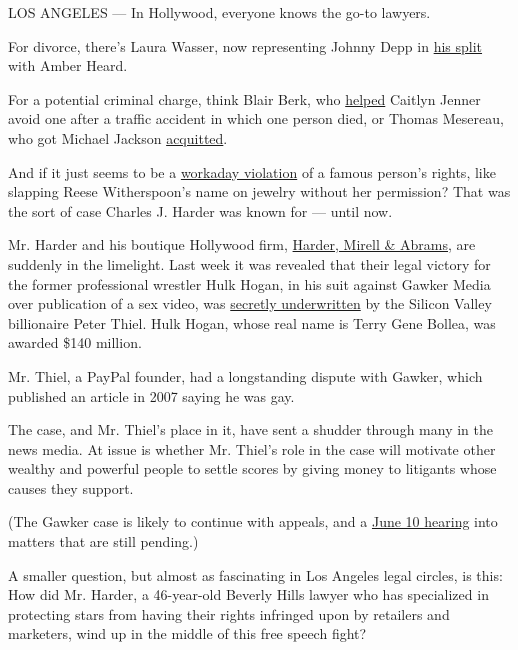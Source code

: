 LOS ANGELES --- In Hollywood, everyone knows the go-to lawyers.

For divorce, there's Laura Wasser, now representing Johnny Depp in
\href{http://www.people.com/article/johnny-depp-amber-heard-alleged-abuse-financial-gain}{his
split} with Amber Heard.

For a potential criminal charge, think Blair Berk, who
\href{http://www.latimes.com/local/lanow/la-me-ln-charges-declined-caitlyn-jenner-20150930-story.html}{helped}
Caitlyn Jenner avoid one after a traffic accident in which one person
died, or Thomas Mesereau, who got Michael Jackson
\href{http://www.today.com/id/8208361/ns/today-today_entertainment/t/mez-dominated-jackson-courtroom/\#.V0s_zfkrK70}{acquitted}.

And if it just seems to be a
\href{http://www.hollywoodreporter.com/thr-esq/hollywood-docket-reese-witherspoon-settles-866160}{workaday
violation} of a famous person's rights, like slapping Reese
Witherspoon's name on jewelry without her permission? That was the sort
of case Charles J. Harder was known for --- until now.

Mr. Harder and his boutique Hollywood firm,
\href{http://hmafirm.com/}{Harder, Mirell \& Abrams}, are suddenly in
the limelight. Last week it was revealed that their legal victory for
the former professional wrestler Hulk Hogan, in his suit against Gawker
Media over publication of a sex video, was
\href{http://www.nytimes3xbfgragh.onion/2016/05/26/business/dealbook/peter-thiel-tech-billionaire-reveals-secret-war-with-gawker.html}{secretly
underwritten} by the Silicon Valley billionaire Peter Thiel. Hulk Hogan,
whose real name is Terry Gene Bollea, was awarded \$140 million.

Mr. Thiel, a PayPal founder, had a longstanding dispute with Gawker,
which published an article in 2007 saying he was gay.

The case, and Mr. Thiel's place in it, have sent a shudder through many
in the news media. At issue is whether Mr. Thiel's role in the case will
motivate other wealthy and powerful people to settle scores by giving
money to litigants whose causes they support.

(The Gawker case is likely to continue with appeals, and a
\href{http://www.hollywoodreporter.com/thr-esq/judge-upholds-hulk-hogans-140-897301}{June
10 hearing} into matters that are still pending.)

A smaller question, but almost as fascinating in Los Angeles legal
circles, is this: How did Mr. Harder, a 46-year-old Beverly Hills lawyer
who has specialized in protecting stars from having their rights
infringed upon by retailers and marketers, wind up in the middle of this
free speech fight?

